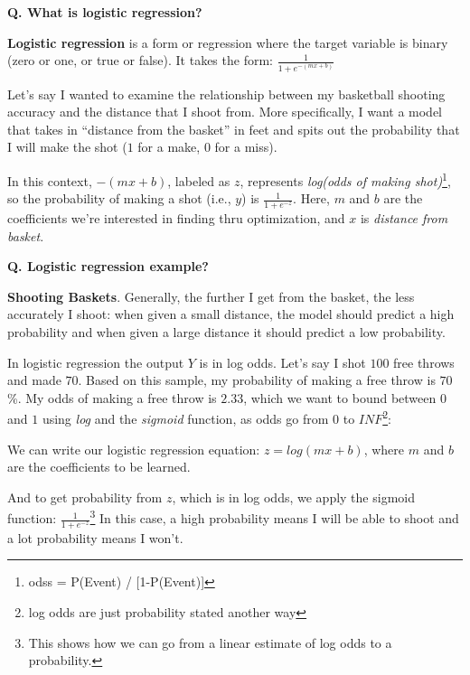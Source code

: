 \begin{frame}[fragile]{\textbf{Q. What is logistic regression?}}
  \begin{wideitemize}
  \item \textbf{Logistic regression} is a form or regression where the
  target variable is binary (zero or one, or true or false). It takes the form:
  {\Large $\frac{1}{1 + e^{-(mx + b)}}$}
  \item Let's say I wanted to examine the relationship between my basketball
  shooting accuracy and the distance that I shoot from. More specifically, I want
  a model that takes in ``distance from the basket'' in feet and spits out the
  probability that I will make the shot ($1$ for a make, $0$ for a miss).
  \begin{wideitemize}\vspace{2mm}\small
    \item In this context, $-(mx + b)$, labeled as $z$, represents
    \textit{log(odds of making shot)}\footnote{odss = P(Event) / [1-P(Event)]},
    so the probability of making a shot (i.e., $y$) is $\frac{1}{1 + e^{-z}}$.
    Here, $m$ and $b$ are the coefficients we're interested in finding thru optimization,
    and $x$ is \textit{distance from basket}.
  \end{wideitemize}
  \end{wideitemize}
\end{frame}


\begin{frame}[fragile]{\textbf{Q. Logistic regression example?}}
  \begin{wideitemize}
  \item \textbf{Shooting Baskets}. Generally, the further I get from the basket,
  the less accurately I shoot: when given a small distance, the model should predict
  a high probability and when given a large distance it should predict a low probability.
  \begin{wideitemize}\vspace{2mm}\small
    \item In logistic regression the output $Y$ is in log odds. Let's say I shot
    $100$ free throws and made $70$. Based on this sample, my probability of making
    a free throw is $70$\%. My odds of making a free throw is $2.33$, which we
    want to bound between $0$ and $1$ using \textit{log} and the \textit{sigmoid} function,
    as odds go from $0$ to $INF$\footnote{log odds are just probability stated another way}:
    \item We can write our logistic regression equation: $z = log(mx + b)$, where
    $m$ and $b$ are the coefficients to be learned.
    \item And to get probability from $z$, which is in log odds, we apply the sigmoid
    function: $\frac{1}{1 + e^{-z}}$\footnote{This shows how we can go from a linear
    estimate of log odds to a probability.} In this case, a high probability means
    I will be able to shoot and a lot probability means I won't.
  \end{wideitemize}
  \end{wideitemize}
\end{frame}


